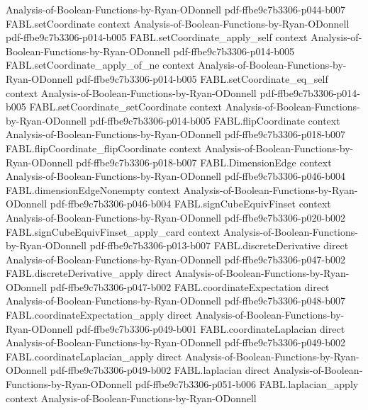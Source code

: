\begin{theorem}
  {Analysis-of-Boolean-Functions-by-Ryan-ODonnell}
  {pdf-ffbe9c7b3306-p044-b007}
\proofstep
  {FABL.setCoordinate}
  {context}
  {Analysis-of-Boolean-Functions-by-Ryan-ODonnell}
  {pdf-ffbe9c7b3306-p014-b005}
\proofstep
  {FABL.setCoordinate_apply_self}
  {context}
  {Analysis-of-Boolean-Functions-by-Ryan-ODonnell}
  {pdf-ffbe9c7b3306-p014-b005}
\proofstep
  {FABL.setCoordinate_apply_of_ne}
  {context}
  {Analysis-of-Boolean-Functions-by-Ryan-ODonnell}
  {pdf-ffbe9c7b3306-p014-b005}
\proofstep
  {FABL.setCoordinate_eq_self}
  {context}
  {Analysis-of-Boolean-Functions-by-Ryan-ODonnell}
  {pdf-ffbe9c7b3306-p014-b005}
\proofstep
  {FABL.setCoordinate_setCoordinate}
  {context}
  {Analysis-of-Boolean-Functions-by-Ryan-ODonnell}
  {pdf-ffbe9c7b3306-p014-b005}
\proofstep
  {FABL.flipCoordinate}
  {context}
  {Analysis-of-Boolean-Functions-by-Ryan-ODonnell}
  {pdf-ffbe9c7b3306-p018-b007}
\proofstep
  {FABL.flipCoordinate_flipCoordinate}
  {context}
  {Analysis-of-Boolean-Functions-by-Ryan-ODonnell}
  {pdf-ffbe9c7b3306-p018-b007}
\proofstep
  {FABL.DimensionEdge}
  {context}
  {Analysis-of-Boolean-Functions-by-Ryan-ODonnell}
  {pdf-ffbe9c7b3306-p046-b004}
\proofstep
  {FABL.dimensionEdgeNonempty}
  {context}
  {Analysis-of-Boolean-Functions-by-Ryan-ODonnell}
  {pdf-ffbe9c7b3306-p046-b004}
\proofstep
  {FABL.signCubeEquivFinset}
  {context}
  {Analysis-of-Boolean-Functions-by-Ryan-ODonnell}
  {pdf-ffbe9c7b3306-p020-b002}
\proofstep
  {FABL.signCubeEquivFinset_apply_card}
  {context}
  {Analysis-of-Boolean-Functions-by-Ryan-ODonnell}
  {pdf-ffbe9c7b3306-p013-b007}
\proofstep
  {FABL.discreteDerivative}
  {direct}
  {Analysis-of-Boolean-Functions-by-Ryan-ODonnell}
  {pdf-ffbe9c7b3306-p047-b002}
\proofstep
  {FABL.discreteDerivative_apply}
  {direct}
  {Analysis-of-Boolean-Functions-by-Ryan-ODonnell}
  {pdf-ffbe9c7b3306-p047-b002}
\proofstep
  {FABL.coordinateExpectation}
  {direct}
  {Analysis-of-Boolean-Functions-by-Ryan-ODonnell}
  {pdf-ffbe9c7b3306-p048-b007}
\proofstep
  {FABL.coordinateExpectation_apply}
  {direct}
  {Analysis-of-Boolean-Functions-by-Ryan-ODonnell}
  {pdf-ffbe9c7b3306-p049-b001}
\proofstep
  {FABL.coordinateLaplacian}
  {direct}
  {Analysis-of-Boolean-Functions-by-Ryan-ODonnell}
  {pdf-ffbe9c7b3306-p049-b002}
\proofstep
  {FABL.coordinateLaplacian_apply}
  {direct}
  {Analysis-of-Boolean-Functions-by-Ryan-ODonnell}
  {pdf-ffbe9c7b3306-p049-b002}
\proofstep
  {FABL.laplacian}
  {direct}
  {Analysis-of-Boolean-Functions-by-Ryan-ODonnell}
  {pdf-ffbe9c7b3306-p051-b006}
\proofstep
  {FABL.laplacian_apply}
  {context}
  {Analysis-of-Boolean-Functions-by-Ryan-ODonnell}

\end{theorem}
